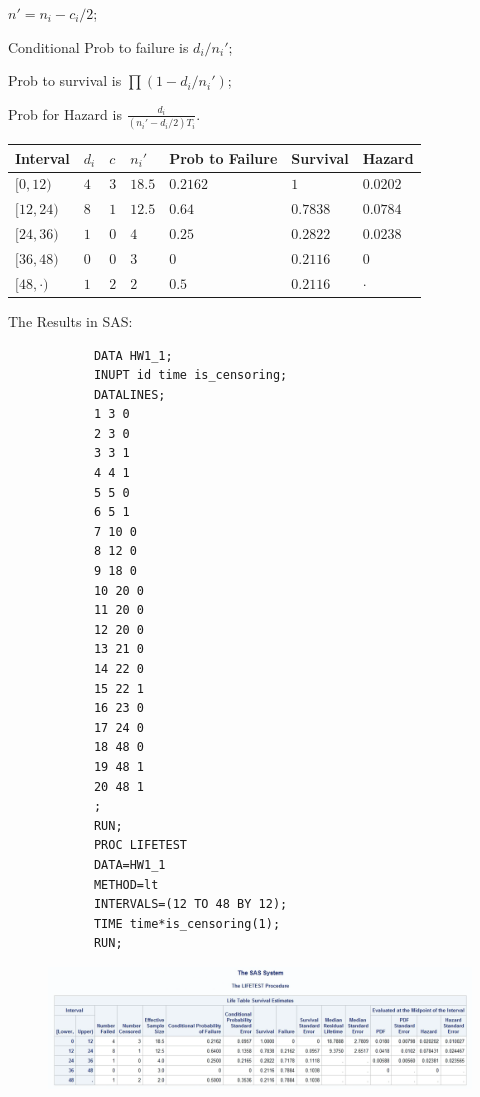 \documentclass[12pt]{elegantbook}
\begin{document}
    \begin{solution}
        $n'=n_i-c_i/2$; 
        
        Conditional Prob to failure is $d_i/n_i'$;
        
        Prob to survival is $\prod (1-d_i/n_i')$; 

        Prob for Hazard is $\frac{d_i}{(n_i'-d_i/2)T_i}$.
        \begin{table}[h]
        \centering
        \begin{tabular}{lllllll}
        \hline
        Interval & $d_i$ & $c$ & $n_i'$ & Prob to Failure & Survival & Hazard \\ \hline
                $[0,12)$ &  $4$ & $3$  &  $18.5$  &     $0.2162$      &  $1$   &   $0.0202$   \\
                $[12,24)$ &  $8$ & $1$  &  $12.5$  &    $0.64$       &  $0.7838$   &   $0.0784$   \\
                $[24,36)$ & $1$  & $0$  &  $4$  &     $0.25$      &  $0.2822$   &    $0.0238$  \\
                $[36,48)$ & $0$  & $0$  &  $3$  &    $0$       &  $0.2116$   &   $0$   \\
                $[48,\cdot)$ & $1$  &  $2$ &  $2$  &     $0.5$      &   $0.2116$  &   $\cdot$   \\ \hline
        \end{tabular}
        \end{table}

        The Results in SAS: 
        \begin{verbatim}
            DATA HW1_1;
            INUPT id time is_censoring;
            DATALINES;
            1 3 0
            2 3 0
            3 3 1
            4 4 1
            5 5 0
            6 5 1
            7 10 0
            8 12 0
            9 18 0
            10 20 0
            11 20 0
            12 20 0
            13 21 0
            14 22 0
            15 22 1
            16 23 0
            17 24 0
            18 48 0
            19 48 1
            20 48 1
            ;
            RUN;
            PROC LIFETEST 
            DATA=HW1_1 
            METHOD=lt 
            INTERVALS=(12 TO 48 BY 12);
            TIME time*is_censoring(1);
            RUN;
        \end{verbatim}
        \begin{figure}[h]
        \centering
        \includegraphics[width=\textwidth]{HW1_1.png}
        \end{figure}
    \end{solution}
\end{document}
